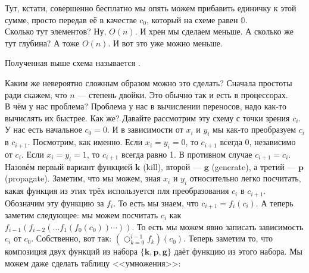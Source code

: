 \documentclass{article}
\begin{document}
\begin{itemize}
\begin{Example}
\begin{center}
\end{center}
            Тут, кстати, совершенно бесплатно мы опять можем прибавить единичку к этой сумме, просто передав её в качестве $c_0$, который на схеме равен $\mathbb0$.\\
            Сколько тут элементов? Ну, $O(n)$. И хрен мы сделаем меньше. А сколько же тут глубина? А тоже $O(n)$. И вот это уже можно меньше.
        \end{Example}
        \dfn Полученная выше схема называется .
        \begin{Example}
            Каким же невероятно сложным образом можно это сделать? Сначала простоты ради скажем, что $n$ --- степень двойки. Это обычно так и есть в процессорах.\\
            В чём у нас проблема? Проблема у нас в вычислении переносов, надо как-то вычислять их быстрее. Как же? Давайте рассмотрим эту схему с точки зрения $c_i$. У нас есть начальное $c_0=0$. И в зависимости от $x_i$ и $y_i$ мы как-то преобразуем $c_i$ в $c_{i+1}$. Посмотрим, как именно. Если $x_i=y_i=0$, то $c_{i+1}$ всегда 0, независимо от $c_i$. Если $x_i=y_i=1$, то $c_{i+1}$ всегда равно 1. В противном случае $c_{i+1}=c_i$. Назовём первый вариант функцией $\mathbf k$ (kill), второй --- $\mathbf g$ (generate), а третий --- $\mathbf p$ (propagate). Заметим, что мы можем, зная $x_i$ и $y_i$ относительно легко посчитать, какая функция из этих трёх используется пля преобразования $c_i$ в $c_{i+1}$. Обозначим эту функцию за $f_i$. То есть мы знаем, что $c_{i+1}=f_i(c_i)$. А теперь заметим следующее: мы можем посчитать $c_i$ как $f_{i-1}(f_{i-2}(\ldots f_1(f_0(c_0))\cdots))$. То есть мы можем явно записать зависимость $c_i$ от $c_0$. Собственно, вот так: $\left(\bigcirc_{k=0}^{i-1}f_k\right)(c_0)$. Теперь заметим то, что композиция двух функций из набора $\{\mathbf k,\mathbf p,\mathbf g\}$ даёт функцию из этого набора. Мы можем даже сделать таблицу <<умножения>>:

\end{Example}
\end{itemize}
\end{document}
